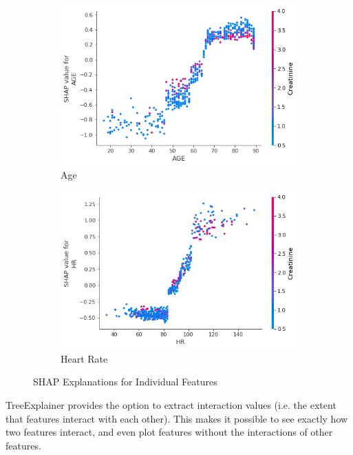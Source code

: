 \documentclass[12pt]{article}
\begin{document}
\begin{figure}[H]
\begin{subfigure}[b]{0.47\textwidth}
         \includegraphics[width=\linewidth]{TreeExplainer Final1 Global/TreeExplainer Final1 Global for AGE.png}
         \caption{Age}
     \end{subfigure}
     \hfill
     \begin{subfigure}[b]{0.47\textwidth}
         \centering
         \includegraphics[width=\linewidth]{TreeExplainer Final1 Global/TreeExplainer Final1 Global for HR.png}
         \caption{Heart Rate}
     \end{subfigure}
     \caption{SHAP Explanations for Individual Features}
        \label{SHAP Final1 Explanations for Individual Features}
\end{figure}


TreeExplainer provides the option to extract interaction values (i.e. the extent that features interact with each other). This makes it possible to see exactly how two features interact, and even plot features without the interactions of other features. 
\end{document}

